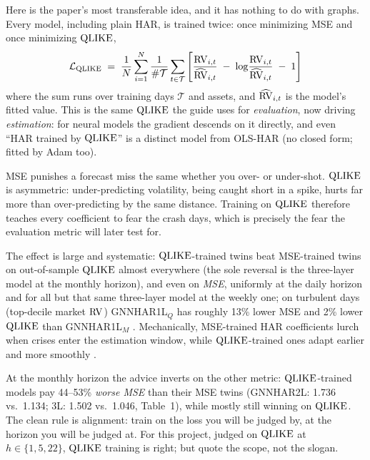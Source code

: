 Here is the paper's most transferable idea, and it has nothing to do with graphs. Every model, including plain HAR, is trained twice: once minimizing MSE and once minimizing $\operatorname{QLIKE}$,
\begin{equation}\label{eq:gnn:qlike-loss}
  \mathcal{L}_{\operatorname{QLIKE}} \;=\; \frac{1}{N}\sum_{i=1}^{N} \frac{1}{\#\mathcal{T}}\sum_{t \in \mathcal{T}}
  \left[ \frac{\operatorname{RV}_{i,t}}{\widehat{\operatorname{RV}}_{i,t}} \;-\; \log\!\frac{\operatorname{RV}_{i,t}}{\widehat{\operatorname{RV}}_{i,t}} \;-\; 1 \right]
\end{equation}
where \citep[eq.~12, p.~12]{ZhangCucuringuDong2023} the sum runs over training days $\mathcal{T}$ and assets, and $\widehat{\operatorname{RV}}_{i,t}$ is the model's fitted value. This is the same $\operatorname{QLIKE}$ the guide uses for \emph{evaluation}, now driving \emph{estimation}: for neural models the gradient descends on it directly, and even ``HAR trained by $\operatorname{QLIKE}$'' is a distinct model from OLS-HAR (no closed form; fitted by Adam too).

\begin{intuition}
MSE punishes a forecast miss the same whether you over- or under-shot. $\operatorname{QLIKE}$ is asymmetric: under-predicting volatility, being caught short in a spike, hurts far more than over-predicting by the same distance. Training on $\operatorname{QLIKE}$ therefore teaches every coefficient to fear the crash days, which is precisely the fear the evaluation metric will later test for.
\end{intuition}

The effect is large and systematic: $\operatorname{QLIKE}$-trained twins beat MSE-trained twins on out-of-sample $\operatorname{QLIKE}$ almost everywhere (the sole reversal is the three-layer model at the monthly horizon), and even on \emph{MSE}, uniformly at the daily horizon and for all but that same three-layer model at the weekly one; on turbulent days (top-decile market $\operatorname{RV}$) GNNHAR1L$_Q$ has roughly 13\% lower MSE and 2\% lower $\operatorname{QLIKE}$ than GNNHAR1L$_M$ \citep[Tables~1--2, pp.~15--17]{ZhangCucuringuDong2023}. Mechanically, MSE-trained HAR coefficients lurch when crises enter the estimation window, while $\operatorname{QLIKE}$-trained ones adapt earlier and more smoothly \citep[Fig.~6, p.~20]{ZhangCucuringuDong2023}.

\begin{warning}
At the monthly horizon the advice inverts on the other metric: $\operatorname{QLIKE}$-trained models pay 44--53\% \emph{worse MSE} than their MSE twins (GNNHAR2L: 1.736 vs.\ 1.134; 3L: 1.502 vs.\ 1.046, Table~1), while mostly still winning on $\operatorname{QLIKE}$. The clean rule is alignment: train on the loss you will be judged by, at the horizon you will be judged at. For this project, judged on $\operatorname{QLIKE}$ at $h \in \{1,5,22\}$, $\operatorname{QLIKE}$ training is right; but quote the scope, not the slogan.
\end{warning}

